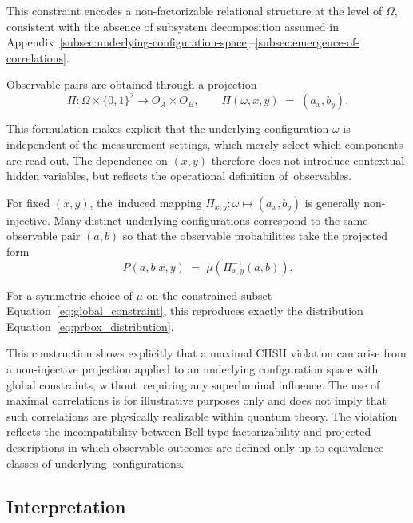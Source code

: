 \documentclass[11pt,a4paper]{article}
\theoremstyle{remark}
\begin{document}
    This constraint encodes a non-factorizable relational structure at the level of
    $\Omega$, consistent with the absence of subsystem decomposition assumed in
    Appendix~\ref{subsec:underlying-configuration-space}--\ref{subsec:emergence-of-correlations}.

    Observable pairs are obtained through a projection
\begin{equation}
      \Pi:\Omega \times \{0,1\}^2 \to O_A\times O_B,\qquad
      \Pi(\omega,x,y) \;=\; (a_x,b_y).
      \label{eq:contextual_projection}
    \end{equation}

    This formulation makes explicit that the underlying configuration $\omega$ is
    independent of the measurement settings, which merely select which components are
    read out.
    The dependence on $(x,y)$ therefore does not introduce contextual hidden variables,
    but reflects the operational definition of~observables.

    For fixed $(x,y)$, the~induced mapping
    $\Pi_{x,y}:\omega \mapsto (a_x,b_y)$ is generally non-injective.
    Many distinct underlying configurations correspond to the same observable pair
    $(a,b)$ so that the observable probabilities take the projected form
\begin{equation}
      P(a,b|x,y) \;=\; \mu\!\left(\Pi_{x,y}^{-1}(a,b)\right).
      \label{eq:projected_probabilities_chsh}
    \end{equation}

    For a symmetric choice of $\mu$ on the constrained subset
    Equation~\eqref{eq:global_constraint}, this reproduces exactly the distribution
    Equation~\eqref{eq:prbox_distribution}.

    This construction shows explicitly that a maximal CHSH violation can arise from a
    non-injective projection applied to an underlying configuration space with global
    constraints, without~requiring any superluminal influence.
    The use of maximal correlations is for illustrative purposes only and does not
    imply that such correlations are physically realizable within quantum theory.
    The violation reflects the incompatibility between Bell-type factorizability and
    projected descriptions in which observable outcomes are defined only up to
    equivalence classes of underlying~configurations.

  \subsection{Interpretation}
    \label{subsec:interpretation}
\end{document}
